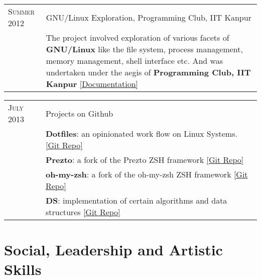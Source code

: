 \documentclass[a4paper,10pt]{article} %
\begin{document}
\begin{tabular}{>{\raggedleft}p{2.2cm}|p{14cm}}
    \textsc{Summer 2012} & GNU/Linux Exploration, Programming Club, IIT Kanpur\\
                           & \footnotesize{ The project involved exploration of various facets of
                             \textbf{GNU/Linux} like the file system, process management,
                             memory management, shell interface etc. And was
                             undertaken under the aegis of \textbf{Programming Club, IIT Kanpur}
                             \href{https://docs.google.com/document/d/1ZHO9w36aoq3oaZBR4Um1AOmDfiTDAEgM6baQAu3icw4/edit?usp=sharing}
                             {[Documentation]} } \\
\end{tabular}

\begin{tabular}{>{\raggedleft}p{2.2cm}|p{14cm}}
    \textsc{July 2013} & Projects on Github \\
                       & \footnotesize{\textbf{Dotfiles}: an opinionated work flow on Linux Systems.
                         \href{https://github.com/srijanshetty/dotfiles} {[Git Repo]} } \\
                       & \footnotesize{\textbf{Prezto}: a fork of the Prezto ZSH framework
                          \href{https://github.com/srijanshetty/prezto} {[Git Repo]}} \\
                       & \footnotesize {\textbf{oh-my-zsh}: a fork of the oh-my-zsh ZSH framework
                          \href{https://github.com/srijanshetty/oh-my-zsh} {[Git Repo]} } \\
                       & \footnotesize{\textbf{DS}: implementation of certain algorithms and data structures
                          \href{https://github.com/srijanshetty/DS} {[Git Repo]}} \\
\end{tabular}


\section {Social, Leadership and Artistic Skills}
\end{document}
